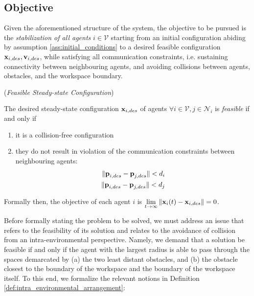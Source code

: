 \subsection{Objective}

Given the aforementioned structure of the system, the objective to be
pursued is the \textit{stabilization of all agents} $i \in \mathcal{V}$ starting
from an initial configuration abiding by assumption
\eqref{ass:initial_conditions} to a desired feasible configuration
$\bm{\mathbf{x}}_{i,des}, \bm{\mathbf{v}}_{i,des}$, while
satisfying all communication constraints, i.e. sustaining connectivity between
neighbouring agents, and avoiding collisions between agents, obstacles, and the
workspace boundary.

\begin{bw_box}
\begin{definition} (\textit{Feasible Steady-state Configuration})

The desired steady-state configuration $\bm{\mathbf{x}}_{i,des}$ of agents
$\forall i \in \mathcal{V}, j \in \mathcal{N}_i$ is \textit{feasible} if and
only if

\begin{enumerate}
  \item it is a collision-free configuration
  \item they do not result in violation of the communication constraints
    between neighbouring agents:
    \begin{align}
      \|\bm{\mathbf{p}}_{i,des} - \bm{\mathbf{p}}_{j,des}\| < d_i \\
      \|\bm{\mathbf{p}}_{i,des} - \bm{\mathbf{p}}_{j,des}\| < d_j \\
    \end{align}
\end{enumerate}

\end{definition}
\end{bw_box}

Formally then, the objective of each agent $i$ is
$\lim\limits_{t \to \infty} \|\bm{\mathbf{x}}_i(t) - \bm{\mathbf{x}}_{i,des}\| = 0$.

Before formally stating the problem to be solved, we must address an issue
that refers to the feasibility of its solution and relates to the avoidance of
collision from an intra-environmental perspective. Namely, we demand that a
solution be feasible if and only if the agent with the largest radius is able to
pass through the spaces demarcated by (a) the two least distant obstacles,
and (b) the obstacle closest to the boundary of the workspace and the
boundary of the workspace itself. To this end, we formalize the relevant notions
in Definition \eqref{def:intra_environmental_arrangement}:

